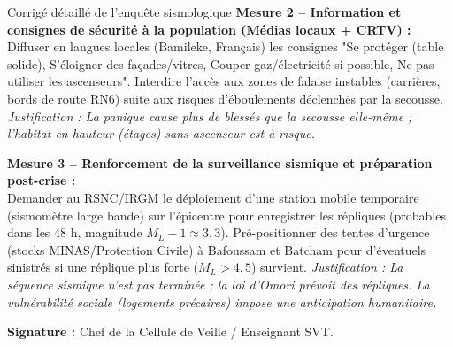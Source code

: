\documentclass[11pt]{article}
\begin{document}
\begin{exoresolu}{Corrigé détaillé de l'enquête sismologique}
\noindent\textbf{Mesure 2 – Information et consignes de sécurité à la population (Médias locaux + CRTV) :}\\
Diffuser en langues locales (Bamileke, Français) les consignes "Se protéger (table solide), S'éloigner des façades/vitres, Couper gaz/électricité si possible, Ne pas utiliser les ascenseurs". Interdire l'accès aux zones de falaise instables (carrières, bords de route RN6) suite aux risques d'éboulements déclenchés par la secousse. \textit{Justification : La panique cause plus de blessés que la secousse elle-même ; l'habitat en hauteur (étages) sans ascenseur est à risque.}

\noindent\textbf{Mesure 3 – Renforcement de la surveillance sismique et préparation post-crise :}\\
Demander au RSNC/IRGM le déploiement d'une station mobile temporaire (sismomètre large bande) sur l'épicentre pour enregistrer les répliques (probables dans les 48 h, magnitude $M_L - 1 \approx 3,3$). Pré-positionner des tentes d'urgence (stocks MINAS/Protection Civile) à Bafoussam et Batcham pour d'éventuels sinistrés si une réplique plus forte ($M_L > 4,5$) survient. \textit{Justification : La séquence sismique n'est pas terminée ; la loi d'Omori prévoit des répliques. La vulnérabilité sociale (logements précaires) impose une anticipation humanitaire.}

\medskip
\noindent\textbf{Signature :} Chef de la Cellule de Veille / Enseignant SVT.
\end{exoresolu}
\end{document}
